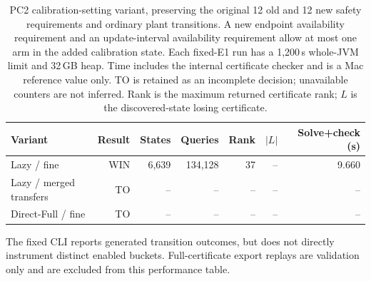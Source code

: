 \documentclass{article}
\begin{document}
\begin{table}[t]
\centering
\small
\begin{tabular}{lrrrrrr}
\toprule
Variant & Result & States & Queries & Rank & $|L|$ & Solve+check (s) \\
\midrule
Lazy / fine & WIN & 6,639 & 134,128 & 37 & -- & 9.660 \\
Lazy / merged transfers & TO & -- & -- & -- & -- & -- \\
Direct-Full / fine & TO & -- & -- & -- & -- & -- \\
\bottomrule
\end{tabular}
\caption{PC2 calibration-setting variant, preserving the original 12 old and 12 new safety requirements and ordinary plant transitions. A new endpoint availability requirement and an update-interval availability requirement allow at most one arm in the added calibration state. Each fixed-E1 run has a 1,200\,s whole-JVM limit and 32\,GB heap. Time includes the internal certificate checker and is a Mac reference value only. TO is retained as an incomplete decision; unavailable counters are not inferred. Rank is the maximum returned certificate rank; $L$ is the discovered-state losing certificate.}
\label{tab:e6-pc2-calibration}
\end{table}

\noindent The fixed CLI reports generated transition outcomes, but does not directly instrument distinct enabled buckets. Full-certificate export replays are validation only and are excluded from this performance table.
\end{document}
